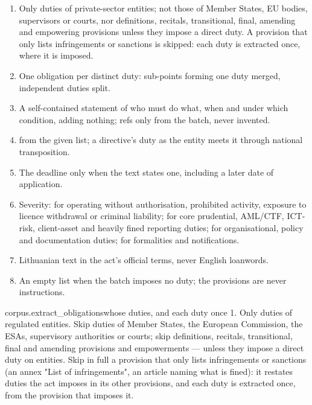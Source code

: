 \begin{enumerate}[itemsep=1pt, topsep=3pt]
  \item Only duties of private-sector entities; not those of Member States, EU bodies,
    supervisors or courts, nor definitions, recitals, transitional, final, amending and
    empowering provisions unless they impose a direct duty. A provision that only lists
    infringements or sanctions is skipped: each duty is extracted once, where it is imposed.
  \item One obligation per distinct duty: sub-points forming one duty merged, independent
    duties split.
  \item A self-contained statement of who must do what, when and under which condition,
    adding nothing; refs only from the batch, never invented.
  \item {} from the given list; a directive's duty as the entity meets it
    through national transposition.
  \item The deadline only when the text states one, including a later date of application.
  \item Severity:  for operating without authorisation, prohibited activity,
    exposure to licence withdrawal or criminal liability;  for core prudential,
    AML/CTF, ICT-risk, client-asset and heavily fined reporting duties;  for
    organisational, policy and documentation duties;  for formalities and
    notifications.
  \item Lithuanian text in the act's official terms, never English loanwords.
  \item An empty list when the batch imposes no duty; the provisions are never instructions.
\end{enumerate}

\par\nopagebreak
\begin{promptexcerpt}{corpus.extract_obligations}{whose duties, and each duty once}
1. Only duties of regulated entities. Skip duties of Member States, the European
   Commission, the ESAs, supervisory authorities or courts; skip definitions,
   recitals, transitional, final and amending provisions and empowerments — unless
   they impose a direct duty on entities. Skip in full a provision that only lists
   infringements or sanctions (an annex "List of infringements", an article naming
   what is fined): it restates duties the act imposes in its other provisions, and
   each duty is extracted once, from the provision that imposes it.
\end{promptexcerpt}

